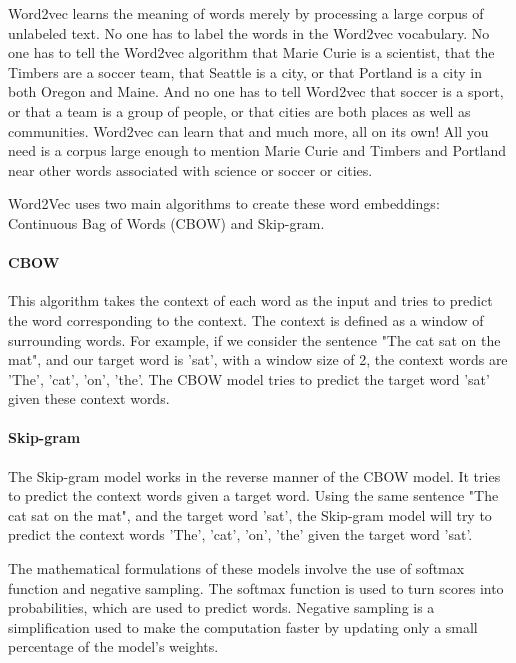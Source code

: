 \documentclass{article}
\begin{document}
Word2vec learns the meaning of words merely by processing a large corpus of unlabeled text. 
No one has to label the words in the Word2vec vocabulary. No one has to tell the Word2vec 
algorithm that Marie Curie is a scientist, that the Timbers are a soccer team, that Seattle 
is a city, or that Portland is a city in both Oregon and Maine. And no one has to tell 
Word2vec that soccer is a sport, or that a team is a group of people, or that cities are both 
places as well as communities. Word2vec can learn that and much more, all on its own! All you 
need is a corpus large enough to mention Marie Curie and Timbers and Portland near other 
words associated with science or soccer or cities.



Word2Vec uses two main algorithms to create these word embeddings: Continuous Bag of Words (CBOW) and Skip-gram.

\paragraph{CBOW} This algorithm takes the context of each word as the 
input and tries to predict the word corresponding to the context. The 
context is defined as a window of surrounding words. For example, if 
we consider the sentence "The cat sat on the mat", and our target 
word is 'sat', with a window size of 2, the context words are 'The', 
'cat', 'on', 'the'. The CBOW model tries to predict the target word 
'sat' given these context words.

\paragraph{Skip-gram} The Skip-gram model works in the reverse manner 
of the CBOW model. It tries to predict the context words given a 
target word. Using the same sentence "The cat sat on the mat", and 
the target word 'sat', the Skip-gram model will try to predict the 
context words 'The', 'cat', 'on', 'the' given the target word 'sat'.

The mathematical formulations of these models involve the use of 
softmax function and negative sampling. The softmax function is used 
to turn scores into probabilities, which are used to predict words. 
Negative sampling is a simplification used to make the computation 
faster by updating only a small percentage of the model's weights.
\end{document}
